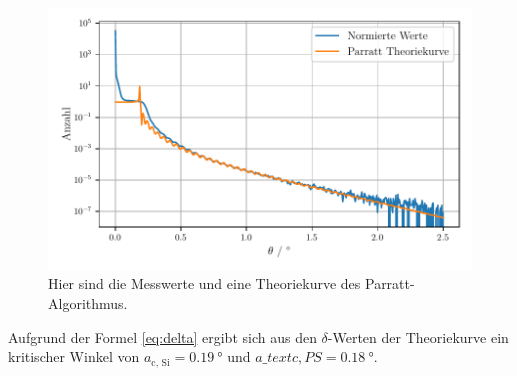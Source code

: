 \begin{figure}
    \centering
    \includegraphics[width=\textwidth]{figures/parat.pdf}
    \caption{Hier sind die Messwerte und eine Theoriekurve des Parratt-Algorithmus.}
    \label{abb:parratt}
\end{figure}

Aufgrund der Formel \eqref{eq:delta} ergibt sich aus den $\delta$-Werten der Theoriekurve ein kritischer Winkel von $a_\text{c, Si}= \SI{0.19}{\degree}$ und $a\_text{c, PS}= \SI{0.18}{\degree}.$

